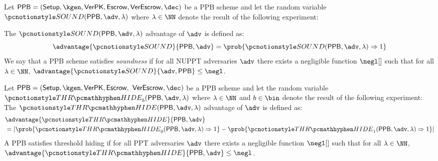 \begin{definition}[Soundness]
	Let $\ppb \allowbreak=\allowbreak (\allowbreak\setup, \allowbreak\kgen, \allowbreak\verpk, \allowbreak\escrow, \allowbreak\verescrow, \allowbreak\dec)$ be a PPB scheme and let the random variable $\soundgame(\allowbreak\ppb,\allowbreak \adv,\allowbreak \secpar)$ where $\secpar \in \NN$ denote the result of the following experiment:

	The $\soundgame(\ppb, \adv, \secpar)$ advantage of $\adv$ is defined as:
	$$
		\advantage{\soundgame}{\ppb, \adv}= \prob{\soundgame(\ppb, \adv, \secpar) \Rightarrow 1}
	$$
	We say that a PPB scheme satisfies \emph{soundness} if for all NUPPT adversaries $\adv$ there exists a negligible function $\negl[]$ such that for all $\secpar \in \NN$, $\advantage{\soundgame}{\adv, \ppb} \leq \negl$.
\end{definition}

\begin{definition}
	Let $\ppb \allowbreak=\allowbreak (\allowbreak\setup,\allowbreak \kgen,\allowbreak \verpk,\allowbreak \escrow,$ $\allowbreak \verescrow,\allowbreak \dec)$ be a PPB scheme and let the random variable $\thrhidegame_b(\ppb, \adv, \secpar)$ where $\secpar \in \NN$ and $b \in \bin$ denote the result of the following experiment:
	The $\thrhidegame(\ppb, \adv, \secpar)$ advantage of $\adv$ is defined as:
	\begin{align*}
		 & \advantage{\thrhidegame}{\ppb, \adv}                                                                                                \\
		 & = \left|\prob{\thrhidegame_0(\ppb, \adv, \secpar) \Rightarrow 1} - \prob{\thrhidegame_1(\ppb, \adv, \secpar) \Rightarrow 1} \right|
	\end{align*}
	A PPB satisfies threshold hiding if for all PPT adversaries $\adv$ there exists a negligible function $\negl[]$ such that for all $\secpar \in \NN$, $\advantage{\thrhidegame}{\ppb, \adv} \leq \negl$.
\end{definition}

